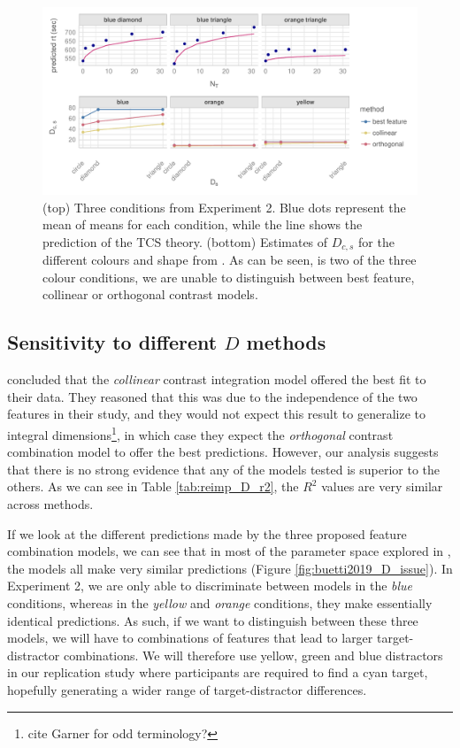 \documentclass[smallextended, natbib]{svjour3}       %
\begin{document}
\begin{figure}
\centering
\includegraphics[width=\textwidth]{../plots/computational_replication_issues.pdf}
\caption{(top) Three conditions from Experiment 2. Blue dots represent the mean of means for each condition, while the line shows the prediction of the TCS theory. (bottom) Estimates of $D_{c,s}$ for the different colours and shape from \cite{buetti2019predicting}. As can be seen, is two of the three colour conditions, we are unable to distinguish between best feature, collinear or orthogonal contrast models.}
\label{fig:comp_rep_conditions}
\end{figure}


\subsection{Sensitivity to different $D$ methods}

\cite{buetti2019predicting} concluded that the \textit{collinear} contrast integration model offered the best fit to their data. They reasoned that this was due to the independence of the two features in their study, and they would not expect this result to generalize to integral dimensions\footnote{cite Garner for odd terminology?}, in which case they expect the \textit{orthogonal} contrast combination model to offer the best predictions. However, our analysis suggests that there is no strong evidence that any of the models tested is superior to the others. As we can see in Table \ref{tab:reimp_D_r2}, the $R^2$ values are very similar across methods. 

If we look at the different predictions made by the three proposed feature combination models, we can see that in most of the parameter space explored in \citep{buetti2019predicting}, the models all make very similar predictions (Figure \ref{fig:buetti2019_D_issue}). In Experiment 2, we are only able to discriminate between models in the \textit{blue} conditions, whereas in the \textit{yellow} and \textit{orange} conditions, they make essentially identical predictions. As such, if we want to distinguish between these three models, we will have to combinations of features that lead to larger target-distractor combinations. We will therefore use yellow, green and blue distractors in our replication study where participants are required to find a cyan target, hopefully generating a wider range of target-distractor differences.
\end{document}
